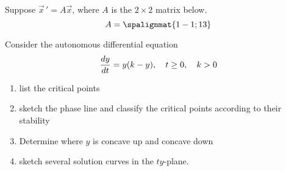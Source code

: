 \documentclass[12pt]{exam}
\begin{document}
\begin{questions}
    
    
\newpage \Initials

    \question[10] %
    Suppose $\vec x \, ' = A \vec x$, where $A$ is the $2\times 2$ matrix below. 
    $$A = \spalignmat{1 -1;1 3}$$ %
    
    

    

    
\newpage \Initials

    \question[10] Consider the autonomous differential equation 
    $${\frac{dy}{dt}} = y(k - y), \quad t \ge 0, \quad k  > 0$$  %
    \begin{enumerate}[label=(\roman*)]
        \item list the critical points \vspace{1cm}
        \item sketch the phase line and classify the critical points according to their stability \vspace{4cm}
        \item Determine where $y$ is concave up and concave down \vspace{6cm}
        \item sketch several solution curves in the $ty$-plane. 
    \end{enumerate}

\newpage \Initials


\end{questions}
\end{document}
